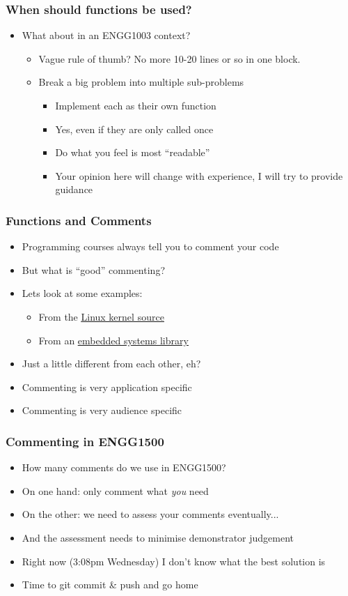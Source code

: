 \documentclass[14pt]{beamer}
\begin{document}
\begin{frame}
\frametitle{When should functions be used?}
\begin{itemize}
\item What about in an ENGG1003 context?
\pause
	\begin{itemize}
		\item Vague rule of thumb? No more 10-20 lines or so in one block.
		\item Break a big problem into multiple sub-problems
			\begin{itemize}
				\item Implement each as their own function
				\pause
				\item Yes, even if they are only called once
				\pause
				\item Do what you feel is most ``readable''
				\pause
				\item Your opinion here will change with experience, I will try to provide guidance
			\end{itemize}
	\end{itemize}
\end{itemize}
\end{frame}

\begin{frame}
\frametitle{Functions and Comments}
\begin{itemize}
\item Programming courses always tell you to comment your code
\item But what is ``good'' commenting?
\item Lets look at some examples:
\pause
	\begin{itemize}
		\item From the \underline{\href{https://raw.githubusercontent.com/torvalds/linux/master/kernel/async.c}{Linux kernel source}}
		\pause
		\item From an \underline{\href{http://libopencm3.org/docs/latest/stm32f4/html/adc_8c_source.html}{embedded systems library}}
	\end{itemize}
\pause
\item Just a little different from each other, eh?
\item Commenting is very application specific
\item Commenting is very audience specific
\end{itemize}
\end{frame}

\begin{frame}
\frametitle{Commenting in ENGG1500}
\begin{itemize}
\item How many comments do we use in ENGG1500?
\item On one hand: only comment what \textit{you} need
\item On the other: we need to assess your comments eventually...
\pause
\item And the assessment needs to minimise demonstrator judgement
\item Right now (3:08pm Wednesday) I don't know what the best solution is
\item Time to git commit \& push and go home
\end{itemize}
\end{frame}
\end{document}
